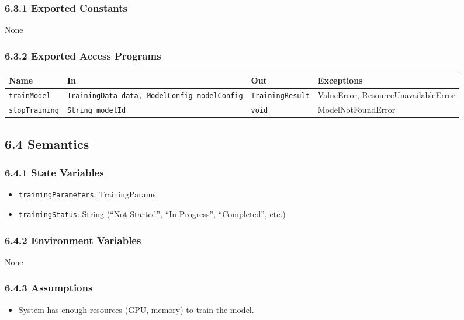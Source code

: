 \documentclass[12pt, titlepage]{article}
\begin{document}
\subsubsection{6.3.1 Exported Constants}
None

\subsubsection{6.3.2 Exported Access Programs}
\begin{center}
\begin{tabular}{p{3.5cm} p{4.5cm} p{4cm} p{3cm}}
\hline
\textbf{Name} & \textbf{In} & \textbf{Out} & \textbf{Exceptions} \\
\hline
\texttt{trainModel} & \texttt{TrainingData data, ModelConfig modelConfig} & \texttt{TrainingResult} & ValueError, ResourceUnavailableError \\
\hline
\texttt{stopTraining} & \texttt{String modelId} & \texttt{void} & ModelNotFoundError \\
\hline
\end{tabular}
\end{center}

\subsection{6.4 Semantics}

\subsubsection{6.4.1 State Variables}
\begin{itemize}
    \item \texttt{trainingParameters}: TrainingParams
    \item \texttt{trainingStatus}: String (``Not Started'', ``In Progress'', ``Completed'', etc.)
\end{itemize}

\subsubsection{6.4.2 Environment Variables}
None

\subsubsection{6.4.3 Assumptions}
\begin{itemize}
    \item System has enough resources (GPU, memory) to train the model.
\end{itemize}
\end{document}
